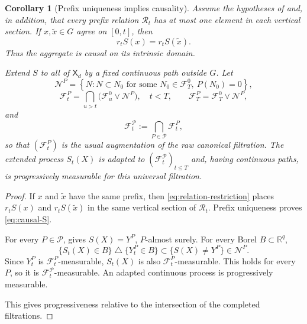 \documentclass[11pt,reqno]{amsart}
\theoremstyle{plain}
\newtheorem{corollary}[corollary]{Corollary}
\theoremstyle{definition}
\newcommand{\R}{\mathbb R}
\newcommand{\cF}{\mathcal F}
\newcommand{\cP}{\mathcal P}
\newcommand{\cR}{\mathcal R}
\begin{document}
\begin{corollary}[Prefix uniqueness implies causality]
\label{cor:prefix-causality}
Assume the hypotheses of  and, in addition,
that every prefix relation \(\cR_t\) has at most one element in each vertical
section.  If \(x,\widetilde x\in G\) agree on \([0,t]\), then
\begin{equation}\label{eq:causal-S}
  r_tS(x)=r_tS(\widetilde x).
\end{equation}
Thus the aggregate is causal on its intrinsic domain.

Extend \(S\) to all of \(\mathsf X_d\) by a fixed continuous path outside
\(G\).  Let
\[
  \mathcal N^P
  =
  \left\{
    N:N\subset N_0\text{ for some }
    N_0\in\cF_T^0,\ P(N_0)=0
  \right\},
\]
\[
  \cF_t^P
  =
  \bigcap_{u>t}\bigl(\cF_u^0\vee\mathcal N^P\bigr),
  \quad t<T,
  \qquad
  \cF_T^P=\cF_T^0\vee\mathcal N^P,
\]
and
\[
  \cF_t^{\cP}
  :=
  \bigcap_{P\in\cP}\cF_t^P,
\]
so that \((\cF_t^P)\) is the usual augmentation of the raw canonical
filtration.
The extended process \(S_t(X)\) is adapted to
\((\cF_t^{\cP})_{t\le T}\) and, having continuous paths, is progressively
measurable for this universal filtration.
\end{corollary}

\begin{proof}
If \(x\) and \(\widetilde x\) have the same prefix, then
\eqref{eq:relation-restriction} places \(r_tS(x)\) and
\(r_tS(\widetilde x)\) in the same vertical section of \(\cR_t\).
Prefix uniqueness proves \eqref{eq:causal-S}.

For every \(P\in\cP\),  gives
\(S(X)=Y^P\), \(P\)-almost surely.  For every Borel
\(B\subset\R^q\),
\[
  \{S_t(X)\in B\}
  \mathbin{\triangle}
  \{Y_t^P\in B\}
  \subset
  \{S(X)\ne Y^P\}\in\mathcal N^P.
\]
Since \(Y^P_t\) is \(\cF_t^P\)-measurable, \(S_t(X)\) is also
\(\cF_t^P\)-measurable.  This holds for every \(P\), so it is
\(\cF_t^{\cP}\)-measurable.  An adapted continuous process is progressively
measurable.

This gives progressiveness relative to the intersection of the completed
filtrations.
\end{proof}
\end{document}
